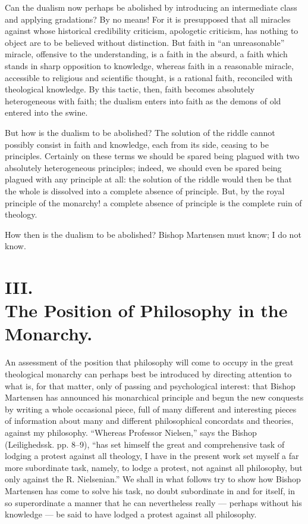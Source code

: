 \documentclass[12pt]{book}
\newcommand{\opage}[1]{\marginnote{\footnotesize\textit{[#1]}}}
\begin{document}
Can the dualism now perhaps be abolished by introducing an intermediate class and applying gradations? By no means! For it is presupposed that all miracles against whose historical credibility criticism, apologetic criticism, has nothing to object are to be believed without distinction. But faith in ``an unreasonable'' miracle, offensive to the understanding, is a faith in the absurd, a faith which stands in sharp opposition to knowledge, whereas faith in a reasonable miracle, accessible to religious and scientific thought, is
\opage{75}\setcounter{footnote}{0}%
a rational faith, reconciled with theological knowledge. By this tactic, then, faith becomes absolutely heterogeneous with faith; the dualism enters into faith as the demons of old entered into the swine.

But how is the dualism to be abolished? The solution of the riddle cannot possibly consist in faith and knowledge, each from its side, ceasing to be principles. Certainly on these terms we should be spared being plagued with two absolutely heterogeneous principles; indeed, we should even be spared being plagued with any principle at all: the solution of the riddle would then be that the whole is dissolved into a complete absence of principle. But, by the royal principle of the monarchy! a complete absence of principle is the complete ruin of theology.

How then is the dualism to be abolished? Bishop Martensen must know; I do not know.

\section*{III.\\ The Position of Philosophy in the Monarchy.}

An assessment of the position that philosophy will come to occupy in the great theological monarchy can perhaps best be introduced by directing attention to what is, for that matter, only of passing and psychological interest: that Bishop Martensen has announced his monarchical principle and begun the new conquests by writing a whole occasional piece, full of many different and interesting pieces of information about many and different philosophical concordats and theories, against my philosophy. ``Whereas Professor Nielsen,'' says the Bishop (Leilighedssk. pp. 8--9), ``has set himself the great and comprehensive task of lodging a protest against all theology, I have in the present work set myself a far more subordinate task, namely, to lodge a protest, not against all philosophy, but only against the R.
\opage{76}\setcounter{footnote}{0}%
Nielsenian.'' We shall in what follows try to show how Bishop Martensen has come to solve his task, no doubt subordinate in and for itself, in so superordinate a manner that he can nevertheless really --- perhaps without his knowledge --- be said to have lodged a protest against all philosophy.
\end{document}
